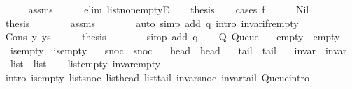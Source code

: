 \begin{isabellebody}
\ \ \ \ \isamarkupfalse%
\ assms\isanewline
\ \ \ \ \isamarkupfalse%
\ {\isacharparenleft}{\kern0pt}elim\ list{\isacharunderscore}{\kern0pt}non{\isacharunderscore}{\kern0pt}emptyE{\isacharparenright}{\kern0pt}\isanewline
\ \ \isamarkupfalse%
\ {\isacharquery}{\kern0pt}thesis\isanewline
\ \ \isamarkupfalse%
\ {\isacharparenleft}{\kern0pt}cases\ f{\isacharparenright}{\kern0pt}\isanewline
\ \ \ \ \isamarkupfalse%
\ Nil\isanewline
\ \ \ \ \isamarkupfalse%
\ {\isacharquery}{\kern0pt}thesis\isanewline
\ \ \ \ \ \ \isamarkupfalse%
\ assms\isanewline
\ \ \ \ \ \ \isamarkupfalse%
\ {\isacharparenleft}{\kern0pt}auto\ simp\ add{\isacharcolon}{\kern0pt}\ q\ intro{\isacharcolon}{\kern0pt}\ invar{\isacharunderscore}{\kern0pt}if{\isacharunderscore}{\kern0pt}r{\isacharunderscore}{\kern0pt}empty{\isacharparenright}{\kern0pt}\isanewline
\ \ \isamarkupfalse%
\isanewline
\ \ \ \ \isamarkupfalse%
\ {\isacharparenleft}{\kern0pt}Cons\ y\ ys{\isacharparenright}{\kern0pt}\isanewline
\ \ \ \ \isamarkupfalse%
\ {\isacharquery}{\kern0pt}thesis\isanewline
\ \ \ \ \ \ \isamarkupfalse%
\ {\isacharparenleft}{\kern0pt}simp\ add{\isacharcolon}{\kern0pt}\ q{\isacharparenright}{\kern0pt}\isanewline
\ \ \isamarkupfalse%
\isanewline
{}\isamarkupfalse%
%
\endisatagproof
{\isafoldproof}%
%
\isadelimproof
\isanewline
%
\endisadelimproof
\isanewline
{}\isamarkupfalse%
\ Q{\isacharcolon}{\kern0pt}\ Queue\ \isanewline
\ \ empty\ {\isacharequal}{\kern0pt}\ empty\ \isanewline
\ \ is{\isacharunderscore}{\kern0pt}empty\ {\isacharequal}{\kern0pt}\ is{\isacharunderscore}{\kern0pt}empty\ \isanewline
\ \ snoc\ {\isacharequal}{\kern0pt}\ snoc\ \isanewline
\ \ head\ {\isacharequal}{\kern0pt}\ head\ \isanewline
\ \ tail\ {\isacharequal}{\kern0pt}\ tail\ \isanewline
\ \ invar\ {\isacharequal}{\kern0pt}\ invar\ \isanewline
\ \ list\ {\isacharequal}{\kern0pt}\ list\isanewline
%
\isadelimproof
\ \ %
\endisadelimproof
%
\isatagproof
{}\isamarkupfalse%
\ list{\isacharunderscore}{\kern0pt}empty\ invar{\isacharunderscore}{\kern0pt}empty\isanewline
\ \ \isamarkupfalse%
\ {\isacharparenleft}{\kern0pt}intro\ is{\isacharunderscore}{\kern0pt}empty\ list{\isacharunderscore}{\kern0pt}snoc\ list{\isacharunderscore}{\kern0pt}head\ list{\isacharunderscore}{\kern0pt}tail\ invar{\isacharunderscore}{\kern0pt}snoc\ invar{\isacharunderscore}{\kern0pt}tail\ Queue{\isachardot}{\kern0pt}intro{\isacharparenright}{\kern0pt}%
\endisatagproof
{\isafoldproof}%
%
\isadelimproof
\isanewline
%
\endisadelimproof
%
\isadelimtheory
\isanewline
%
\endisadelimtheory
%
\isatagtheory
{}\isamarkupfalse%
%
\endisatagtheory
{\isafoldtheory}%
%
\isadelimtheory
%
\endisadelimtheory
%
\end{isabellebody}%
